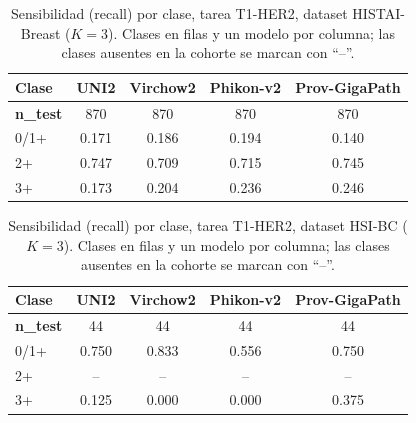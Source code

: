 \begin{table}[H]
\centering
\caption{Sensibilidad (recall) por clase, tarea T1-HER2, dataset HISTAI-Breast ($K=3$). Clases en filas y un modelo por columna; las clases ausentes en la cohorte se marcan con ``--''.}
\label{tab:anexo_her2_sensibilidad_histai}
\begin{tabular}{l c c c c}
\toprule
\textbf{Clase} & \textbf{UNI2} & \textbf{Virchow2} & \textbf{Phikon-v2} & \textbf{Prov-GigaPath} \\
\midrule
\textbf{n\_test} & 870 & 870 & 870 & 870 \\
0/1+ & 0.171 & 0.186 & 0.194 & 0.140 \\
2+ & 0.747 & 0.709 & 0.715 & 0.745 \\
3+ & 0.173 & 0.204 & 0.236 & 0.246 \\
\bottomrule
\end{tabular}
\end{table}

\begin{table}[H]
\centering
\caption{Sensibilidad (recall) por clase, tarea T1-HER2, dataset HSI-BC ($K=3$). Clases en filas y un modelo por columna; las clases ausentes en la cohorte se marcan con ``--''.}
\label{tab:anexo_her2_sensibilidad_hsibc}
\begin{tabular}{l c c c c}
\toprule
\textbf{Clase} & \textbf{UNI2} & \textbf{Virchow2} & \textbf{Phikon-v2} & \textbf{Prov-GigaPath} \\
\midrule
\textbf{n\_test} & 44 & 44 & 44 & 44 \\
0/1+ & 0.750 & 0.833 & 0.556 & 0.750 \\
2+ & -- & -- & -- & -- \\
3+ & 0.125 & 0.000 & 0.000 & 0.375 \\
\bottomrule
\end{tabular}
\end{table}

